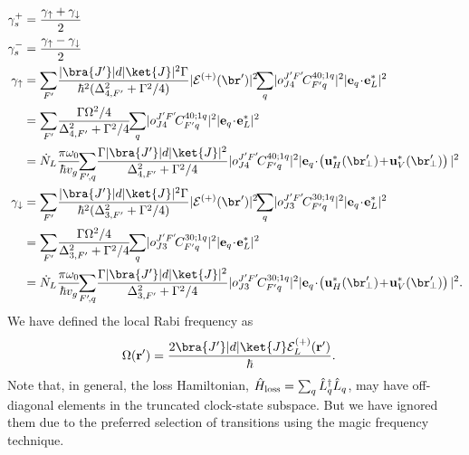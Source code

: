 \documentclass[]{report}
\begin{document}
\begin{align}
 \gamma_s^+ &= \frac{\gamma_{\uparrow}+\gamma_{\downarrow} }{2}\\
\gamma_s^- &= \frac{\gamma_{\uparrow}-\gamma_{\downarrow} }{2}\\
\!\!\!\!\!\!\!\! \gamma_{\uparrow} &=  \sum_{F'} \! \frac{|\bra{J'}|d|\ket{J}|^2\Gamma}{\hbar^2(\Delta_{4,F'}^2+\Gamma^2/4)}|\mathcal{E}^{(+)}(\br')|^2\!\! \sum_{q}\! |o^{J'F'}_{J4}\! C^{4 0;1q}_{F' q} |^2 |\mathbf{e}_q\!\cdot\! \mathbf{e}_L^*|^2\\
&=  \sum_{F'} \! \frac{\Gamma\Omega^2/4}{\Delta_{4,F'}^2+\Gamma^2/4}\!\! \sum_{q}\! |o^{J'F'}_{J4}\! C^{4 0;1q}_{F' q} |^2 |\mathbf{e}_q\!\cdot\! \mathbf{e}_L^*|^2\\
&= \dot{N}_L \frac{\pi \omega_0}{\hbar v_g} \!\!\sum_{F'\! , q}\! \frac{\Gamma |\bra{J'}|d|\ket{J}|^2}{\Delta_{4,F'}^2+\Gamma^2/4} |o^{J'F'}_{J4}\! C^{4 0;1q}_{F' q}|^2  %
|\mathbf{e}_q \!\cdot\! 
\left( \mathbf{u}_{H}^*(\br^\prime\!\!_\perp) \!+\! 
\mathbf{u}_{V}^*(\br^\prime\!\!_\perp)\right) |^2\\
\gamma_{\downarrow} &= \sum_{F'} \! \frac{|\bra{J'}|d|\ket{J}|^2\Gamma}{\hbar^2(\Delta_{3,F'}^2+\Gamma^2/4)}|\mathcal{E}^{(+)}(\br')|^2\!\! \sum_{q}\! |o^{J'F'}_{J3}\! C^{3 0;1q}_{F' q} |^2 |\mathbf{e}_q\!\cdot\! \mathbf{e}_L^*|^2\\
&=  \sum_{F'} \! \frac{\Gamma\Omega^2/4}{\Delta_{3,F'}^2+\Gamma^2/4}\!\! \sum_{q}\! |o^{J'F'}_{J3}\! C^{3 0;1q}_{F' q} |^2 |\mathbf{e}_q\!\cdot\! \mathbf{e}_L^*|^2\\
&= \dot{N}_L\frac{\pi \omega_0}{\hbar v_g} \!\!\sum_{F'\! , q}\! \frac{\Gamma |\bra{J'}|d|\ket{J}|^2}{\Delta_{3,F'}^2+\Gamma^2/4} |o^{J'F'}_{J3}\! C^{3 0;1q}_{F' q}|^2  %
|\mathbf{e}_q \!\cdot\! 
\left( \mathbf{u}_{H}^*(\br^\prime\!\!_\perp) \!+\! 
\mathbf{u}_{V}^*(\br^\prime\!\!_\perp)\right) |^2.
\end{align}
We have defined the local Rabi frequency as
\begin{align}
\Omega(\mathbf{r}') &= \frac{2\bra{J'}| d | \ket{J} \mathcal{E}^{(+)}_L(\mathbf{r}')}{\hbar}.
\end{align}
Note that, in general, the loss Hamiltonian, $ \hat{H}_{\rm loss}=\sum_q \hat{L}_q^\dagger\hat{L}_q $, may have off-diagonal elements in the truncated clock-state subspace. But we have ignored them due to the preferred selection of transitions using the magic frequency technique. 
\end{document}
